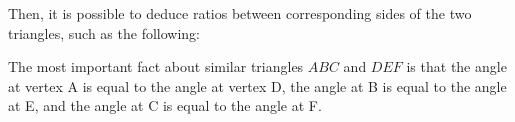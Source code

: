       \par 
      \label{m39405*id78224}Then, it is possible to deduce ratios between corresponding sides of the two triangles, such as the following:\par 
      \label{m39405*id78228}\nopagebreak\noindent{}
      \label{m39405*id78401}The most important fact about similar triangles \begin{math}ABC\end{math} and \begin{math}DEF\end{math} is that the angle at vertex A is equal to the angle at vertex D, the angle at B is equal to the angle at E, and the angle at C is equal to the angle at F.\par 
